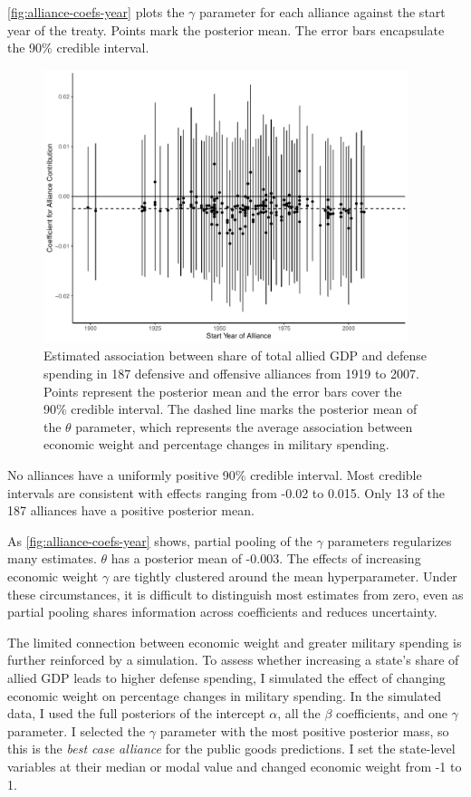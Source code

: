 \documentclass[12pt]{article}
\begin{document}
\autoref{fig:alliance-coefs-year} plots the $\gamma$ parameter for each alliance against the start year of the treaty.
Points mark the posterior mean. 
The error bars encapsulate the 90\% credible interval.


\begin{figure}[htbp]
	\centering
		\includegraphics[width=0.95\textwidth]{alliance-coefs-year.pdf}
	\caption{Estimated association between share of total allied GDP and defense spending in 187 defensive and offensive alliances from 1919 to 2007. Points represent the posterior mean and the error bars cover the 90\% credible interval. The dashed line marks the posterior mean of the $\theta$ parameter, which represents the average association between economic weight and percentage changes in military spending.}
	\label{fig:alliance-coefs-year}
\end{figure}


No alliances have a uniformly positive 90\% credible interval. 
Most credible intervals are consistent with effects ranging from -0.02 to 0.015. 
Only 13 of the 187 alliances have a positive posterior mean. 


As \autoref{fig:alliance-coefs-year} shows, partial pooling of the $\gamma$ parameters regularizes many estimates. 
$\theta$ has a posterior mean of -0.003. 
The effects of increasing economic weight $\gamma$ are tightly clustered around the mean hyperparameter. 
Under these circumstances, it is difficult to distinguish most estimates from zero, even as partial pooling shares information across coefficients and reduces uncertainty. 


The limited connection between economic weight and greater military spending is further reinforced by a simulation.
To assess whether increasing a state's share of allied GDP leads to higher defense spending, I simulated the effect of changing economic weight on percentage changes in military spending. 
In the simulated data, I used the full posteriors of the intercept $\alpha$, all the $\beta$ coefficients, and one $\gamma$ parameter. 
I selected the $\gamma$ parameter with the most positive posterior mass, so this is the \emph{best case alliance} for the public goods predictions. 
I set the state-level variables at their median or modal value and changed economic weight from -1 to 1. 
\end{document}
